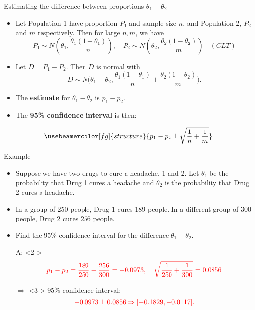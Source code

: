 \documentclass[10pt, handout, xcolor=table]{beamer}
\newcommand*\themecol{\usebeamercolor[fg]{structure}}
\begin{document}
\begin{frame}{Estimating the difference between proportions $\theta_1 - \theta_2$}
\begin{itemize}
\setlength{\itemsep}{10pt}
\item Let Population 1 have proportion $P_1$ and sample size $n$, and Population 2, $P_2$ and $m$ respectively. Then for large $n,m$, we have 
{\small $$P_1 \sim N\left(\theta_1, \frac{\theta_1(1-\theta_1)}{n}\right),\quad  P_2\sim N\left(\theta_2, \frac{\theta_2(1-\theta_2)}{m}\right) \quad (CLT)$$}
\item Let $D = P_1 - P_2$. Then $D$ is normal with 
{\small $$ D \sim N\bigg(\theta_1 - \theta_2,  \frac{\theta_1(1-\theta_1)}{n} +  \frac{\theta_2(1-\theta_2)}{m}\bigg).$$}
\item The \textbf{estimate} for $\theta_1 - \theta_2$ is {\themecol $p_1 - p_2$}.
\item The \textbf{95\% confidence interval} is then:
\end{itemize}
\vspace*{-1ex}
\begin{align*}\themecol
{p_1 - p_2 \pm  \sqrt{ \frac{1}{n} +  \frac{1}{m}}}
\end{align*} 

\end{frame}

\begin{frame}{Example}
\begin{itemize}
\setlength{\itemsep}{10pt}
\item Suppose we have two drugs to cure a headache, 1 and 2. Let $\theta_1$ be the probability that Drug 1 cures a headache and $\theta_2$ is the probability that Drug 2 cures a headache. 
\item In a group of 250 people, Drug 1 cures 189 people. In a different group of 300 people, Drug 2 cures 256 people. 
\item Find the 95\% confidence interval for the difference $\theta_1 - \theta_2$.
\item[A:]<2->
$$\color{red} p_1 - p_2 = \frac{189}{250}- \frac{256}{300} =  -0.0973, \quad \sqrt{\frac{1}{250} + \frac{1}{300}} = 0.0856$$
\item[$\Rightarrow$]<3-> 95\% confidence interval:
$$\color{red} -0.0973  \pm 0.0856 \Rightarrow [-0.1829, -0.0117].$$
\end{itemize}

\end{frame}
\end{document}

